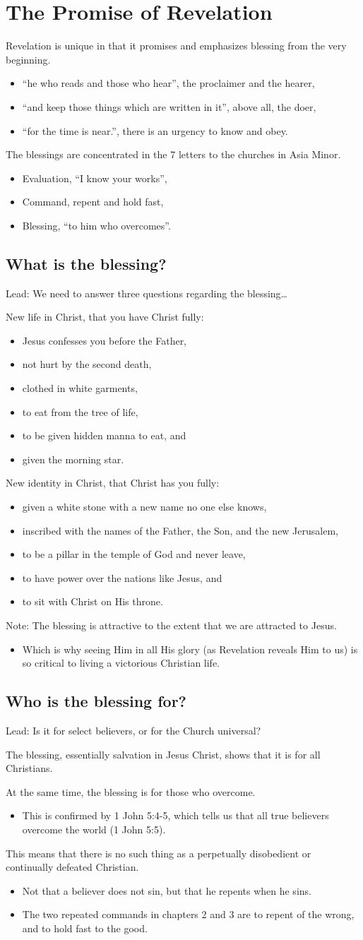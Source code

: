\documentclass[12pt]{article}
\newcommand{\BI}{\begin{itemize}}
\newcommand{\EI}{\end{itemize}}
\newcommand{\I}{\item}
\begin{document}
\section{The Promise of Revelation}
\I  Revelation is unique in that it promises and emphasizes blessing from the very beginning.
\BI \I  ``he who reads and those who hear'', the proclaimer and the hearer,
    \I  ``and keep those things which are written in it'', above all, the doer,
    \I  ``for the time is near.'', there is an urgency to know and obey. \EI
\I  The blessings are concentrated in the 7 letters to the churches in Asia Minor.
\BI \I  Evaluation, ``I know your works'',
    \I  Command, repent and hold fast,
    \I  Blessing, ``to him who overcomes''. \EI

\subsection{What is the blessing?}
\I  Lead: We need to answer three questions regarding the blessing\ldots
\I  New life in Christ, that you have Christ fully: 
\BI \I  Jesus confesses you before the Father,
    \I  not hurt by the second death,
    \I  clothed in white garments, 
    \I  to eat from the tree of life,
    \I  to be given hidden manna to eat, and
    \I  given the morning star. \EI
\I  New identity in Christ, that Christ has you fully:
\BI \I  given a white stone with a new name no one else knows,
    \I  inscribed with the names of the Father, the Son, and the new Jerusalem,
    \I  to be a pillar in the temple of God and never leave,
    \I  to have power over the nations like Jesus, and
    \I  to sit with Christ on His throne. \EI
\I  Note: The blessing is attractive to the extent that we are attracted to Jesus.
\BI \I  Which is why seeing Him in all His glory (as Revelation reveals Him to us)
        is so critical to living a victorious Christian life. \EI

\subsection{Who is the blessing for?}
\I  Lead: Is it for select believers, or for the Church universal?
\I  The blessing, essentially salvation in Jesus Christ, shows that it is for
    all Christians.
\I  At the same time, the blessing is for those who overcome.
\BI \I This is confirmed by 1 John 5:4-5, 
        which tells us that all true believers overcome the world (1 John 5:5). \EI
\I  This means that there is no such thing as a 
    perpetually disobedient or continually defeated Christian.
\BI \I  Not that a believer does not sin, but that he repents when he sins.
    \I  The two repeated commands in chapters 2 and 3 are to repent of the wrong,
        and to hold fast to the good. \EI
\end{document}
